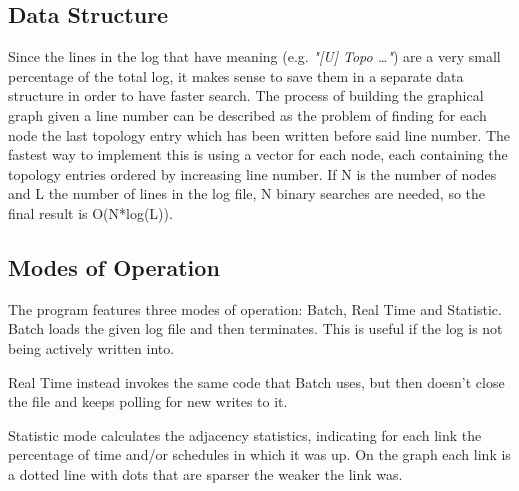 \subsection{Data Structure}
Since the lines in the log that have meaning (e.g. \textit{"[U] Topo \dots"}) are a very small percentage of the total log, it makes sense to save them in a separate data structure in order to have faster search. The process of building the graphical graph given a line number can be described as the problem of finding for each node the last topology entry which has been written before said line number. The fastest way to implement this is using a vector for each node, each containing the topology entries ordered by increasing line number. If N is the number of nodes and L the number of lines in the log file, N binary searches are needed, so the final result is O(N*log(L)).

\subsection{Modes of Operation}
The program features three modes of operation: Batch, Real Time and Statistic.
Batch loads the given log file and then terminates. This is useful if the log is not being actively written into.

Real Time instead invokes the same code that Batch uses, but then doesn't close the file and keeps polling for new writes to it.

Statistic mode calculates the adjacency statistics, indicating for each link the percentage of time and/or schedules in which it was up. On the graph each link is a dotted line with dots that are sparser the weaker the link was.

